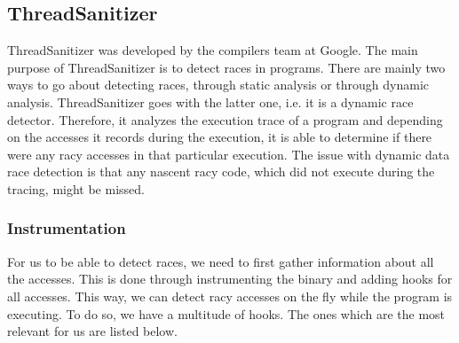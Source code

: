 \documentclass{btp}
\begin{document}
\subsection{ThreadSanitizer}

ThreadSanitizer \cite{tsan} was developed by the compilers team at Google. The main purpose of ThreadSanitizer is to detect races in programs. There are mainly two ways to go about detecting races, through static analysis or through dynamic analysis. ThreadSanitizer goes with the latter one, i.e. it is a dynamic race detector. Therefore, it analyzes the execution trace of a program and depending on the accesses it records during the execution, it is able to determine if there were any racy accesses in that particular execution. The issue with dynamic data race detection is that any nascent racy code, which did not execute during the tracing, might be missed.

\subsubsection{Instrumentation}

For us to be able to detect races, we need to first gather information about all the accesses. This is done through instrumenting the binary and adding hooks for all accesses. This way, we can detect racy accesses on the fly while the program is executing. To do so, we have a multitude of hooks. The ones which are the most relevant for us are listed below.
\end{document}
